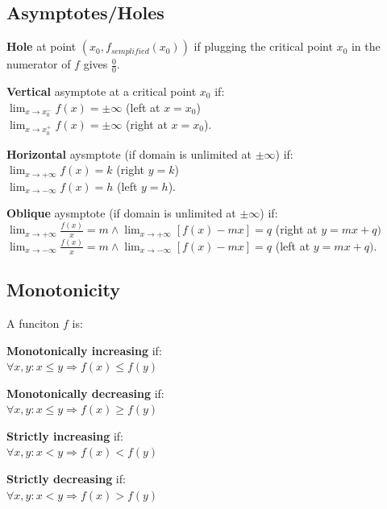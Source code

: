 \documentclass[8pt,a4paper]{extarticle}     %
\theoremstyle{definition}
\theoremstyle{definition}
\theoremstyle{definition}
\begin{document}
\begin{multicols}{4}
\subsection{Asymptotes/Holes}
\begin{bulletlist}
	\item \textbf{Hole} at point $(x_0, f_{\textit{semplified}}(x_0))$ if plugging the critical point $x_0$ in the numerator of $f$ gives $\frac{0}{0}$.
	\item \textbf{Vertical} asymptote at a critical point $x_0$ if:\\ 
	$\lim_{x\to x_0^-}f(x) = \pm \infty$ (left at $x=x_0$)\\ 
	$\lim_{x\to x_0^+}f(x) = \pm \infty$ (right at $x=x_0$). 
	\item \textbf{Horizontal} aysmptote (if domain is unlimited at $\pm \infty$) if:\\
	$\lim_{x\to +\infty}f(x) = k$ (right $y=k$)\\ 
	$\lim_{x\to -\infty}f(x) = h$ (left $y=h$).
	\item \textbf{Oblique} aysmptote (if domain is unlimited at $\pm \infty$) if: \\
	$\lim_{x\to +\infty}\frac{f(x)}{x} = m \land \lim_{x\to +\infty}[f(x)-mx] = q$ (right at $y = mx+q)$\\
	$\lim_{x\to -\infty}\frac{f(x)}{x} = m \land \lim_{x\to -\infty}[f(x)-mx] = q$ (left at $y = mx+q).$
\end{bulletlist}
\subsection{Monotonicity}
A funciton $f$ is:
\begin{bulletlist}
	\item \textbf{Monotonically increasing} if: \\$\forall x,y: x \leq y \Rightarrow f(x) \leq f(y)$
	\item \textbf{Monotonically decreasing} if: \\$\forall x,y: x \leq y \Rightarrow f(x) \geq f(y)$ 
	\item \textbf{Strictly increasing} if: \\$\forall x,y: x < y \Rightarrow f(x) < f(y)$ 
	\item \textbf{Strictly decreasing} if: \\$\forall x,y: x < y \Rightarrow f(x) > f(y)$
\end{bulletlist}


\end{multicols}
\end{document}
